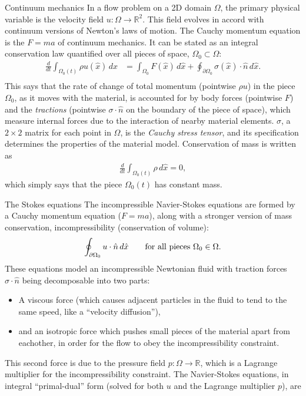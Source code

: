 \documentclass{article}
\begin{document}
{\large Continuum mechanics}
\vskip 0.2in
\noindent
In a flow problem on a 2D domain $\Omega$, the primary physical variable is the velocity field $u : \Omega \rightarrow \mathbb{R}^2$.
This field evolves in accord with continuum versions of Newton's laws of motion.
The Cauchy momentum equation is the $F = ma$ of continuum mechanics. It can be stated as an integral conservation law quantified
over all pieces of space, $\Omega_0 \subset \Omega$:
\begin{align*}
\frac{d}{dt} \int_{\Omega_0(t)} \rho u(\hat{x}) \,d\hat{x} &= \int_{\Omega_0}F(\hat{x})\,d\hat{x} + \oint_{\partial \Omega_0} \sigma(\hat{x})\cdot\hat{n}\,d\hat{x}.\\
\end{align*}
This says that the rate of change of total momentum (pointwise $\rho u$) in the piece $\Omega_0$, as it moves with the material,
is accounted for by body forces (pointwise $F$) and the \textit{tractions} (pointwise $\sigma\cdot\hat{n}$ on the boundary of the piece of space),
which measure internal forces due to the interaction of nearby material elements. $\sigma$, a $2\times 2$ matrix for each point in $\Omega$, is the \textit{Cauchy stress tensor}, and its specification
determines the properties of the material model. Conservation of mass is written as
\begin{align*}
\frac{d}{dt} \int_{\Omega_0(t)} \rho\,d\hat{x} = 0,
\end{align*}
which simply says that the piece $\Omega_0(t)$ has constant mass.


\vskip 0.2in
{\large The Stokes equations}
\vskip 0.2in
\noindent
The incompressible Navier-Stokes equations are formed by a Cauchy momentum equation ($F = ma$),
along with a stronger version of mass conservation, incompressibility (conservation of volume):
    $$\oint_{\partial\Omega_0}u\cdot\hat{n}\,d\hat{x} \text{\quad\quad for all pieces $\Omega_0 \in \Omega$}.$$
These equations model an incompressible Newtonian fluid
with traction forces $\sigma\cdot\hat{n}$ being decomposable into two parts:
\begin{itemize}
    \item A viscous force (which causes adjacent particles
in the fluid to tend to the same speed, like a ``velocity diffusion''),
    \item and an isotropic force which pushes
    small pieces of the material apart from eachother, in order for the flow to obey the incompressibility constraint.
\end{itemize}
This second force is due to the pressure field $p : \Omega \rightarrow \mathbb{R}$, which is a Lagrange multiplier
for the incompressibility constraint. The Navier-Stokes equations, in integral ``primal-dual'' form (solved for both
$u$ and the Lagrange multiplier $p$), are
\begin{align*}
\end{align*}
\end{document}
